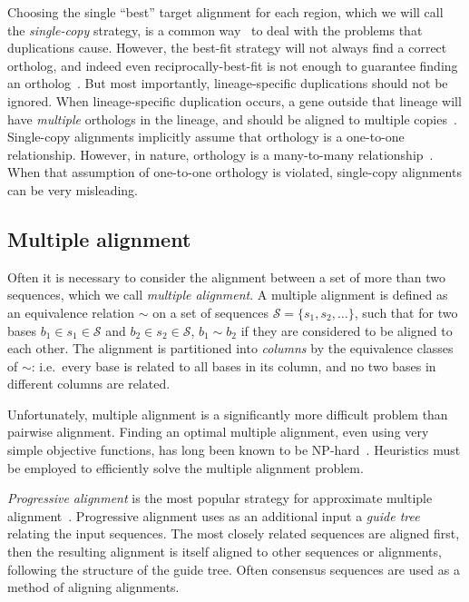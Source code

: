 \documentclass[fleqn,10pt]{wlscirep}
\begin{document}
Choosing the single ``best'' target alignment for each region, which we will call the \emph{single-copy} strategy, is a common way~\cite{blastz,tba} to deal with the problems that duplications cause.
However, the best-fit strategy will not always find a correct ortholog, and indeed even reciprocally-best-fit is not enough to guarantee finding an ortholog~\cite{recipBestOrtholog}.
But most importantly, lineage-specific duplications should not be ignored.
When lineage-specific duplication occurs, a gene outside that lineage will have \emph{multiple} orthologs in the lineage, and should be aligned to multiple copies~\cite{Koonin2005}.
Single-copy alignments implicitly assume that orthology is a one-to-one relationship.
However, in nature, orthology is a many-to-many relationship~\cite{Koonin2005}.
When that assumption of one-to-one orthology is violated, single-copy alignments can be very misleading.

\subsection{Multiple alignment}
Often it is necessary to consider the alignment between a set of more than two sequences, which we call \emph{multiple alignment}.
A multiple alignment is defined as an equivalence relation $\sim$ on a set of sequences $\mathcal{S} = \{s_1, s_2, \ldots\}$, such that for two bases $b_1 \in s_1 \in \mathcal{S}$ and $b_2 \in s_2 \in \mathcal{S}$, $b_1 \sim b_2$ if they are considered to be aligned to each other.
The alignment is partitioned into \emph{columns} by the equivalence classes of $\sim$: i.e.\ every base is related to all bases in its column, and no two bases in different columns are related.

Unfortunately, multiple alignment is a significantly more difficult problem than pairwise alignment.
Finding an optimal multiple alignment, even using very simple objective functions, has long been known to be NP-hard~\cite{complexityOfMultipleAlignment}.
Heuristics must be employed to efficiently solve the multiple alignment problem.

\emph{Progressive alignment} is the most popular strategy for approximate multiple alignment~\cite{progressiveAlignment}.
Progressive alignment uses as an additional input a \emph{guide tree} relating the input sequences.
The most closely related sequences are aligned first, then the resulting alignment is itself aligned to other sequences or alignments, following the structure of the guide tree. Often consensus sequences are used as a method of aligning alignments.
\end{document}
